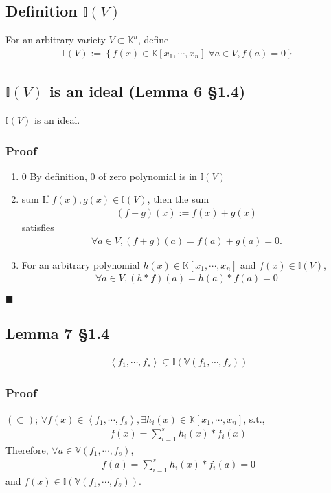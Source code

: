 \documentclass[11pt]{book}
\begin{document}
\subsection{Definition $\mathbb{I}(V)$}
For an arbitrary variety $V \subset \mathbb{K}^n$, define
\begin{eqnarray}
\mathbb{I}(V) := \left\{\left. f(x) \in \mathbb{K}[x_1,\cdots,x_n] \right| \forall a \in V, f(a) = 0 \right\}
\end{eqnarray}

\subsection{$\mathbb{I}(V)$ is an ideal (Lemma 6 \S1.4)}
$\mathbb{I}(V)$ is an ideal.

\subsubsection{Proof}
\begin{enumerate}
\item 0
By definition, 0 of zero polynomial is in $\mathbb{I}(V)$

\item sum
If $f(x), g(x) \in \mathbb{I}(V)$, then the sum
\begin{eqnarray}
(f + g)(x) := f(x) + g(x)
\end{eqnarray}
satisfies
\begin{eqnarray}
\forall a \in V, (f + g)(a) = f(a) + g(a) = 0.
\end{eqnarray}

\item
For an arbitrary polynomial $h(x) \in \mathbb{K}[x_1,\cdots,x_n]$ and $f(x) \in \mathbb{I}(V)$,
\begin{eqnarray}
\forall a \in V, (h*f)(a) = h(a) * f(a) = 0
\end{eqnarray}

\end{enumerate}
$\blacksquare$

\subsection{Lemma 7 \S1.4}
\begin{eqnarray}
\left< f_1, \cdots, f_s \right> \subsetneq \mathbb{I}\left( \mathbb{V} \left( f_1, \cdots, f_s \right) \right)
\end{eqnarray}

\subsubsection{Proof}
$(\subset)$; $\forall f(x) \in \left< f_1, \cdots, f_s \right>, \exists h_i(x) \in \mathbb{K}[x_1,\cdots,x_n]$, s.t.,
\begin{eqnarray}
f(x) = \sum_{i=1}^s h_i(x) * f_i(x)
\end{eqnarray}
Therefore, $\forall a \in \mathbb{V} \left( f_1, \cdots, f_s \right)$,
\begin{eqnarray}
f(a) = \sum_{i=1}^s h_i(x) * f_i(a) = 0
\end{eqnarray}
and $f(x) \in \mathbb{I}\left( \mathbb{V} \left( f_1, \cdots, f_s \right) \right)$.
\end{document}
